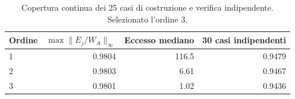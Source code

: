 \begin{table}[htbp]\centering\small
\setlength{\tabcolsep}{4pt}
\begin{tabular}{lrrr}\toprule
Ordine & $\max\|E_j/W_A\|_\infty$ & Eccesso mediano & 30 casi indipendenti\\\midrule
1 & \num{0.9804} & \num{116.5} & \num{0.9479}\\
2 & \num{0.9803} & \num{6.61} & \num{0.9467}\\
3 & \num{0.9801} & \num{1.02} & \num{0.9436}\\
\bottomrule\end{tabular}
\caption{Copertura continua dei 25 casi di costruzione e verifica indipendente. Selezionato l'ordine 3.}
\end{table}
